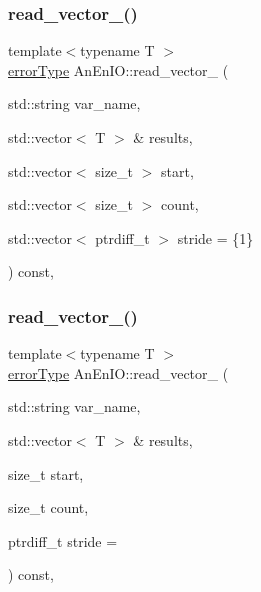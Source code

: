 \subsubsection{\texorpdfstring{read\+\_\+vector\+\_\+()}{read\_vector\_()}\hspace{0.1cm}{\footnotesize\ttfamily [2/3]}}
{\footnotesize\ttfamily template$<$typename T $>$ \\
\mbox{\hyperlink{class_an_en_i_o_aa56bc1ec6610b86db4349bce20f9ead0}{error\+Type}} An\+En\+I\+O\+::read\+\_\+vector\+\_\+ (\begin{DoxyParamCaption}\item[{std\+::string}]{var\+\_\+name,  }\item[{std\+::vector$<$ T $>$ \&}]{results,  }\item[{std\+::vector$<$ size\+\_\+t $>$}]{start,  }\item[{std\+::vector$<$ size\+\_\+t $>$}]{count,  }\item[{std\+::vector$<$ ptrdiff\+\_\+t $>$}]{stride = {\ttfamily \{1\}} }\end{DoxyParamCaption}) const\hspace{0.3cm}{\ttfamily [inline]}, {\ttfamily [protected]}}

\mbox{\label{class_an_en_i_o_a9a0c27d0baddc7e27b25e1d13ac4f313}} 
\subsubsection{\texorpdfstring{read\+\_\+vector\+\_\+()}{read\_vector\_()}\hspace{0.1cm}{\footnotesize\ttfamily [3/3]}}
{\footnotesize\ttfamily template$<$typename T $>$ \\
\mbox{\hyperlink{class_an_en_i_o_aa56bc1ec6610b86db4349bce20f9ead0}{error\+Type}} An\+En\+I\+O\+::read\+\_\+vector\+\_\+ (\begin{DoxyParamCaption}\item[{std\+::string}]{var\+\_\+name,  }\item[{std\+::vector$<$ T $>$ \&}]{results,  }\item[{size\+\_\+t}]{start,  }\item[{size\+\_\+t}]{count,  }\item[{ptrdiff\+\_\+t}]{stride = {} }\end{DoxyParamCaption}) const\hspace{0.3cm}{\ttfamily [inline]}, {\ttfamily [protected]}}

